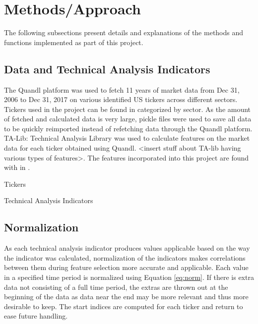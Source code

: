 \documentclass{article}
\begin{document}
\section{Methods/Approach}
The following subsections present details and explanations of the methods and functions implemented as part of this project.

\subsection{Data and Technical Analysis Indicators}
The Quandl platform was used to fetch 11 years of market data from Dec 31, 2006 to Dec 31, 2017 on various identified US tickers across different sectors. Tickers used in the project can be found in  categorized by sector. As the amount of fetched and calculated data is very large, pickle files were used to save all data to be quickly reimported instead of refetching data through the Quandl platform. TA-Lib: Technical Analysis Library was used to calculate features on the market data for each ticker obtained using Quandl. <insert stuff about TA-lib having various types of features>. The features incorporated into this project are found with in .

\begin{table}[h]
	\centering
	\caption{Tickers}
	\label{tab:tick}
\end{table}

\begin{table}[h]
	\centering
	\caption{Technical Analysis Indicators}
	\label{tab:inds}
\end{table}

\subsection{Normalization}
As each technical analysis indicator produces values applicable based on the way the indicator was calculated, normalization of the indicators makes correlations between them during feature selection more accurate and applicable. Each value in a specified time period is normalized using Equation \eqref{eq:norm}. If there is extra data not consisting of a full time period, the extras are thrown out at the beginning of the data as data near the end may be more relevant and thus more desirable to keep. The start indices are computed for each ticker and return to ease future handling.
\end{document}
